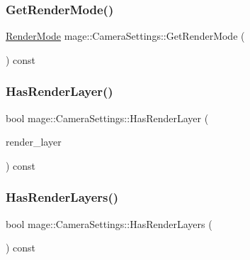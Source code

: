 \subsubsection{\texorpdfstring{Get\+Render\+Mode()}{GetRenderMode()}}
{\footnotesize\ttfamily \hyperlink{namespacemage_a5e7e18b0154373ce8fc942fe3f6b27fd}{Render\+Mode} mage\+::\+Camera\+Settings\+::\+Get\+Render\+Mode (\begin{DoxyParamCaption}{ }\end{DoxyParamCaption}) const\hspace{0.3cm}{\ttfamily [noexcept]}}

\hypertarget{structmage_1_1_camera_settings_a5f5f7e1019db2e65cddc1a62ae30efc7}{}\label{structmage_1_1_camera_settings_a5f5f7e1019db2e65cddc1a62ae30efc7} 
\subsubsection{\texorpdfstring{Has\+Render\+Layer()}{HasRenderLayer()}}
{\footnotesize\ttfamily bool mage\+::\+Camera\+Settings\+::\+Has\+Render\+Layer (\begin{DoxyParamCaption}\item[{\hyperlink{namespacemage_a8b4a82582105b0299e2c2be5af7255d6}{Render\+Layer}}]{render\+\_\+layer }\end{DoxyParamCaption}) const\hspace{0.3cm}{\ttfamily [noexcept]}}

\hypertarget{structmage_1_1_camera_settings_a838dfb8f3d32d3d23a7c72719ce182f3}{}\label{structmage_1_1_camera_settings_a838dfb8f3d32d3d23a7c72719ce182f3} 
\subsubsection{\texorpdfstring{Has\+Render\+Layers()}{HasRenderLayers()}}
{\footnotesize\ttfamily bool mage\+::\+Camera\+Settings\+::\+Has\+Render\+Layers (\begin{DoxyParamCaption}{ }\end{DoxyParamCaption}) const\hspace{0.3cm}{\ttfamily [noexcept]}}

